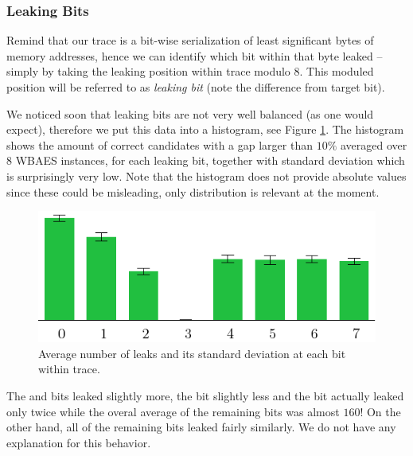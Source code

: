 \subsubsection{Leaking Bits}
	
	Remind that our trace is a bit-wise serialization of least significant bytes of memory addresses, hence we can identify which bit within that byte leaked -- simply by taking the leaking position within trace modulo $8$. This moduled position will be referred to as {\em leaking bit} (note the difference from target bit).
	
	We noticed soon that leaking bits are not very well balanced (as one would expect), therefore we put this data into a histogram, see Figure \ref{fig:leakbitall}. The histogram shows the amount of correct candidates with a gap larger than $10\%$ averaged over $8$ WBAES instances, for each leaking bit, together with standard deviation which is surprisingly very low. Note that the histogram does not provide absolute values since these could be misleading, only distribution is relevant at the moment.
	
	\begin{figure}[h]
	\begin{center}
		\includegraphics{figures/leak_bit/leak_bit.pdf}
		\caption{Average number of leaks and its standard deviation at each bit within trace.}
		\label{fig:leakbitall}
	\end{center}
	\end{figure}
	
	The  and  bits leaked slightly more, the  bit slightly less and the  bit actually leaked only twice while the overal average of the remaining bits was almost $160$! On the other hand, all of the remaining bits leaked fairly similarly. We do not have any explanation for this behavior.



